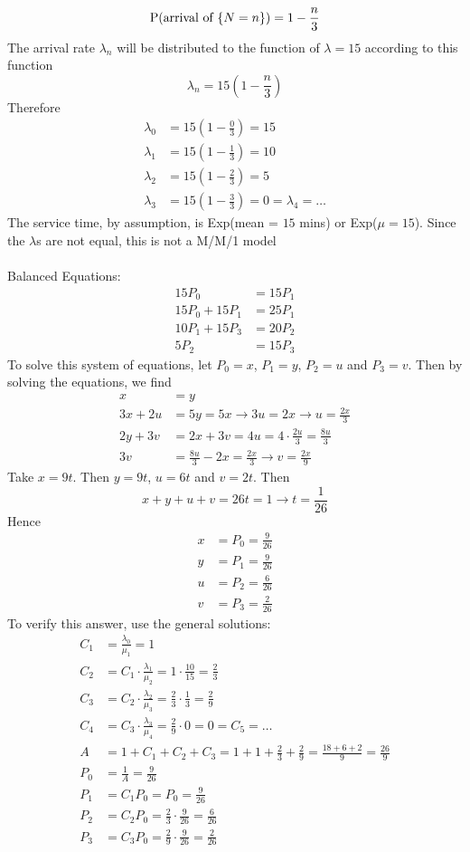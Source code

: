 \documentclass[12pt]{article}
\begin{document}
$$ \mathrm{P}( \text{arrival of } \{N = n\} ) = 1 - \frac{n}{3}$$ 
The arrival rate $\lambda_n$ will be distributed to the function of $\lambda =15$ according to this function $$ \lambda_n = 15(1 - \frac{n}{3})$$ 
Therefore $$ \begin{aligned} \lambda_0 &= 15(1 - \frac{0}{3}) = 15 \\ \lambda_1 &= 15(1 - \frac{1}{3}) = 10 \\ \lambda_2 &= 15(1 - \frac{2}{3}) = 5 \\ \lambda_3 &= 15(1 - \frac{3}{3}) = 0 = \lambda_4 = \dots  \end{aligned} $$
The service time, by assumption, is Exp(mean = $15$ mins) or Exp($\mu = 15$). Since the $\lambda$s are not equal, this is not a M/M/1 model \\~\\
Balanced Equations: $$ \begin{aligned} 15P_0 &= 15P_1 \\ 15P_0 + 15P_1 &= 25P_1 \\ 10P_1 + 15P_3 &= 20P_2 \\ 5P_2 &= 15P_3 \end{aligned} $$ 
To solve this system of equations, let $P_0 = x$, $P_1 = y$, $P_2 = u$ and $P_3 = v$. Then by solving the equations, we find $$ \begin{aligned} x &= y \\ 3x + 2u &= 5y = 5x \to 3u = 2x \to u = \frac{2x}{3} \\ 2y + 3v &= 2x + 3v = 4u = 4 \cdot \frac{2u}{3} = \frac{8u}{3} \\ 3v &= \frac{8u}{3} - 2x = \frac{2x}{3} \to v = \frac{2x}{9} \end{aligned} $$ 
Take $x = 9t$. Then $y = 9t$, $u = 6t$ and $v = 2t$. Then
$$x +y + u + v = 26t = 1 \to t = \frac{1}{26}$$ 
Hence $$ \begin{aligned} x &= P_0 = \frac{9}{26} \\ y &= P_1 = \frac{9}{26} \\ u &= P_2 = \frac{6}{26} \\ v &= P_3 = \frac{2}{26} \end{aligned} $$ 
To verify this answer, use the general solutions: $$ \begin{aligned} C_1 &= \frac{\lambda_0}{\mu_1} = 1 \\ C_2 &= C_1 \cdot \frac{\lambda_1}{\mu_2} = 1 \cdot \frac{10}{15} = \frac{2}{3} \\ C_3 &= C_2 \cdot \frac{\lambda_2}{\mu_3} = \frac{2}{3} \cdot \frac{1}{3} = \frac{2}{9} \\ C_4 &= C_3 \cdot \frac{\lambda_3}{\mu_4} = \frac{2}{9} \cdot 0 = 0 = C_5 = \dots \\ 
A &= 1 + C_1 + C_2 + C_3 = 1 + 1 + \frac{2}{3} + \frac{2}{9} = \frac{18+6+2}{9} = \frac{26}{9} \\ P_0 &= \frac{1}{A} = \frac{9}{26} \\ P_1 &= C_1P_0 = P_0 = \frac{9}{26} \\ P_2 &= C_2P_0 = \frac{2}{3}\cdot\frac{9}{26} = \frac{6}{26} \\ P_3 &= C_3P_0 = \frac{2}{9} \cdot \frac{9}{26} = \frac{2}{26} \end{aligned} $$ 
\end{document}
